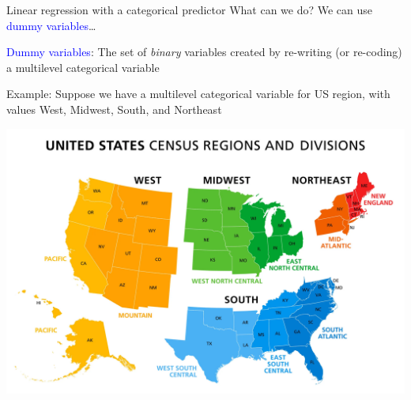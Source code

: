 \documentclass[10pt,t]{beamer}
\begin{document}
\begin{frame}{Linear regression with a categorical predictor}
What can we do? \pause We can use \textcolor{blue}{dummy variables}\dots

\vspace{0.3cm}

\textcolor{blue}{Dummy variables}: The set of \textit{binary} variables created by re-writing (or re-coding) a multilevel categorical variable  \pause

\vspace{0.3cm}

Example: Suppose we have a multilevel categorical variable for US region, with values West, Midwest, South, and Northeast

\vspace{0.1cm}

\centering

\includegraphics[scale=0.06]{us_regions.png}

\end{frame}
\end{document}
